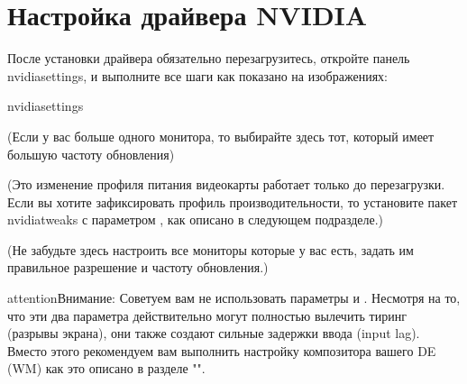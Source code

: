 \documentclass[letterpaper,10pt,russian,openany]{sphinxmanual}
\begin{document}
\ignorespaces 

\section{Настройка драйвера NVIDIA}
\label{\detokenize{source/first-steps:nvidia-driver-setup}}\label{\detokenize{source/first-steps:index-11}}\label{\detokenize{source/first-steps:id10}}
\sphinxAtStartPar
После установки драйвера обязательно перезагрузитесь, откройте панель nvidia\sphinxhyphen{}settings, и выполните все шаги как показано на изображениях:

\begin{sphinxVerbatim}[commandchars=\\\{\}]
nvidia\PYGZhy{}settings 
\end{sphinxVerbatim}

\noindent{}

\sphinxAtStartPar
(Если у вас больше одного монитора, то выбирайте здесь тот, который имеет большую частоту обновления)

\noindent{}

\sphinxAtStartPar
(Это изменение профиля питания видеокарты работает только до перезагрузки.
Если вы хотите зафиксировать профиль производительности,
то установите пакет nvidia\sphinxhyphen{}tweaks с параметром , как описано в следующем подразделе.)

\noindent{}

\sphinxAtStartPar
(Не забудьте здесь настроить все мониторы которые у вас есть, задать им правильное разрешение и частоту обновления.)

\begin{sphinxadmonition}{attention}{Внимание:}
\sphinxAtStartPar
Советуем вам не использовать параметры  и .
Несмотря на то, что эти два параметра действительно могут полностью вылечить тиринг (разрывы экрана), они также создают сильные задержки ввода (input lag).
Вместо этого рекомендуем вам выполнить настройку композитора вашего DE (WM) как это описано в разделе "".
\end{sphinxadmonition}
\end{document}
